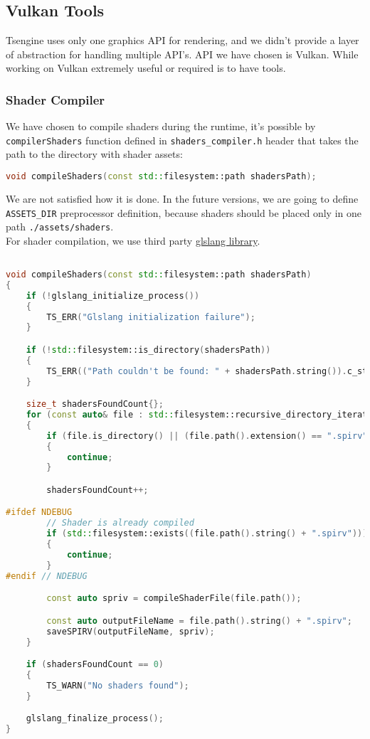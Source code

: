 \newpage

\subsection{Vulkan Tools}
Tsengine uses only one graphics API for rendering, and we didn't provide a layer of abstraction for handling multiple API's. API we have chosen is Vulkan. While working on Vulkan extremely useful or required is to have tools.
\subsubsection{Shader Compiler}
We have chosen to compile shaders during the runtime, it's possible by \texttt{compilerShaders} function defined in \texttt{shaders\_compiler.h} header that takes the path to the directory with shader assets: %
\begin{lstlisting}[language=c++, caption=Shaders Compiler header (./engine/src/vulkan\_tools/shaders\_compiler.h)]
void compileShaders(const std::filesystem::path shadersPath);
\end{lstlisting}
We are not satisfied how it is done. In the future versions, we are going to define \texttt{ASSETS\_DIR} preprocessor definition, because shaders should be placed only in one path \texttt{./assets/shaders}.\\
For shader compilation, we use third party \hyperref[lst:3rdparty]{glslang library}.
\begin{lstlisting}[language=c++, caption=Shader Compiler implementation(./engine/src/vulkan\_tools/shaders\_compiler.cpp)]

void compileShaders(const std::filesystem::path shadersPath)
{
    if (!glslang_initialize_process())
    {
        TS_ERR("Glslang initialization failure");
    }

    if (!std::filesystem::is_directory(shadersPath))
    {
        TS_ERR(("Path couldn't be found: " + shadersPath.string()).c_str());
    }

    size_t shadersFoundCount{};
    for (const auto& file : std::filesystem::recursive_directory_iterator(shadersPath))
    {
        if (file.is_directory() || (file.path().extension() == ".spirv") || (file.path().extension() == ".h"))
        {
            continue;
        }

        shadersFoundCount++;

#ifdef NDEBUG
        // Shader is already compiled
        if (std::filesystem::exists((file.path().string() + ".spirv")))
        {
            continue;
        }
#endif // NDEBUG

        const auto spriv = compileShaderFile(file.path());

        const auto outputFileName = file.path().string() + ".spirv";
        saveSPIRV(outputFileName, spriv);
    }

    if (shadersFoundCount == 0)
    {
        TS_WARN("No shaders found");
    }

    glslang_finalize_process();
}
\end{lstlisting}
